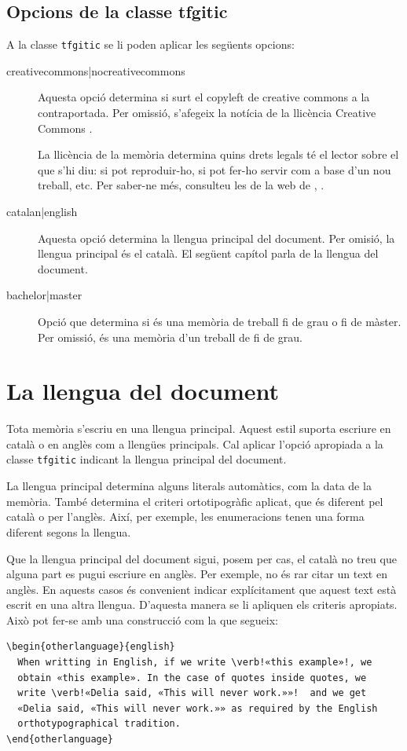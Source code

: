 \documentclass{tfgitic}[2024/07/01]
\begin{document}
\section{Opcions de la classe tfgitic}

A la classe \texttt{tfgitic} se li poden aplicar les següents opcions:
\begin{description}
\item[creativecommons|nocreativecommons] Aquesta opció determina si
  surt el copyleft de creative commons a la contraportada. Per omissió,
  s'afegeix la notícia de la llicència Creative Commons
  .

  La llicència de la memòria determina quins drets legals té el lector
  sobre el que s'hi diu: si pot reproduir-ho, si pot fer-ho servir com
  a base d'un nou treball, etc. Per saber-ne més, consulteu les
   de la web de ,
  \cite{cc22:_creat_comm_web}.

\item[catalan|english] Aquesta opció determina la llengua principal
  del document. Per omisió, la llengua principal és el català. El
  següent capítol parla de la llengua del document.
  
\item[bachelor|master] Opció que determina si és una memòria de
  treball fi de grau o fi de màster. Per omissió, és una memòria d'un
  treball de fi de grau.
\end{description}


\chapter{La llengua del document}

Tota memòria s'escriu en una llengua principal. Aquest estil suporta
escriure en català o en anglès com a llengües principals. Cal aplicar
l'opció apropiada a la classe \texttt{tfgitic} indicant la llengua
principal del document.

La llengua principal determina alguns literals automàtics, com la data
de la memòria. També determina el criteri ortotipogràfic aplicat, que
és diferent pel català o per l'anglès. Així, per exemple, les
enumeracions tenen una forma diferent segons la llengua.

Que la llengua principal del document sigui, posem per cas, el català
no treu que alguna part es pugui escriure en anglès. Per exemple, no
és rar citar un text en anglès. En aquests casos és convenient indicar
explícitament que aquest text està escrit en una altra
llengua. D'aquesta manera se li apliquen els criteris apropiats. Això
pot fer-se amb una construcció com la que segueix:
\begin{verbatim}
\begin{otherlanguage}{english}
  When writting in English, if we write \verb!«this example»!, we
  obtain «this example». In the case of quotes inside quotes, we
  write \verb!«Delia said, «This will never work.»»!  and we get
  «Delia said, «This will never work.»» as required by the English
  orthotypographical tradition.
\end{otherlanguage}
\end{verbatim}
\end{document}
